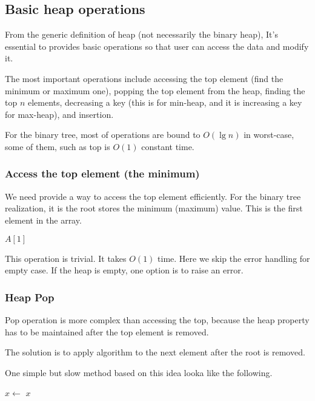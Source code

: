 \documentclass{article}
\begin{document}
\subsection{Basic heap operations}

From the generic definition of heap (not necessarily the binary heap),
It's essential to provides basic operations so that user can access
the data and modify it.

The most important operations include accessing the top element
(find the minimum or maximum one), popping the top element
from the heap, finding the top $n$ elements, decreasing a key (this
is for min-heap, and it is increasing a key for max-heap), and
insertion.

For the binary tree, most of operations are bound to $O(\lg n)$ in
worst-case, some of them, such as top is $O(1)$ constant time.

\subsubsection{Access the top element (the minimum)}
We need provide a way to access the top element efficiently.
For the binary tree realization, it is the
root stores the minimum (maximum) value. This is the first
element in the array.

\begin{algorithmic}[1]
  \State \Return $A[1]$
\EndFunction
\end{algorithmic}

This operation is trivial. It takes $O(1)$ time.
Here we skip the error handling for empty case. If the
heap is empty, one option is to raise an error.

\subsubsection{Heap Pop}

Pop operation is more
complex than accessing the top, because the heap property has to be maintained
after the top element is removed.

The solution is to apply  algorithm to the
next element after the root is removed.

One simple but slow method based on this idea looka like
the following.

\begin{algorithmic}[1]
  \State $x \gets$ 
  \State {}
    \State {}
  \EndIf
  \State \Return $x$
\EndFunction
\end{algorithmic}
\end{document}
